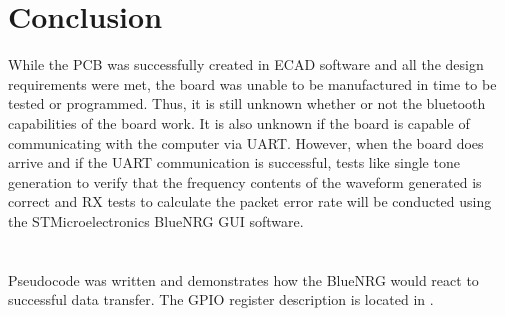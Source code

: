 \documentclass[12pt,journal,onecolumn,draftclsnofoot]{IEEEtran}
\begin{document}
\section{Conclusion}
While the PCB was successfully created in ECAD software and all the design requirements were met, the board was unable to be manufactured in time to be tested or programmed. Thus, it is still unknown whether or not the bluetooth capabilities of the board work. It is also unknown if the board is capable of communicating with the computer via UART. However, when the board does arrive and if the UART communication is successful, tests like single tone generation to verify that the frequency contents of the waveform generated is correct and RX tests to calculate the packet error rate will be conducted using the STMicroelectronics BlueNRG GUI software.
\appendices
\section{}
Pseudocode was written and demonstrates how the BlueNRG would react to successful data transfer. The GPIO register description is located in \cite{bluenrg2}.
\end{document}
